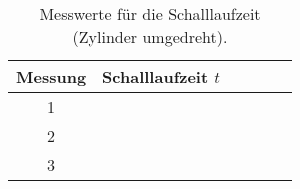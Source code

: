 \begin{table}[H]
  \centering
  \caption{Messwerte für die Schalllaufzeit (Zylinder umgedreht).}
  \label{tab:tab2}
    \begin{tabular}{c c c c c c}
    \toprule
    Messung & Schalllaufzeit $t$\\
    \midrule
    1 &    \\
    2&     \\
    3&     \\

    \bottomrule
    \end{tabular}
  \end{table}
